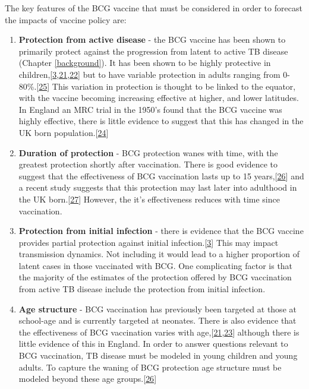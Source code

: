 \documentclass[11pt,twoside]{bristolthesis}
\begin{document}
  The key features of the BCG vaccine that must be considered in order to forecast the impacts of vaccine policy are:
  \begin{enumerate}
  \def\labelenumi{\arabic{enumi}.}
  \item
    \textbf{Protection from active disease} - the BCG vaccine has been shown to primarily protect against the progression from latent to active TB disease (Chapter \ref{background}). It has been shown to be highly protective in children,{[}\protect\hyperlink{ref-Roy2014}{3},\protect\hyperlink{ref-Rodrigues1993}{21},\protect\hyperlink{ref-Colditz1994}{22}{]} but to have variable protection in adults ranging from 0-80\%.{[}\protect\hyperlink{ref-Zwerling2011}{25}{]} This variation in protection is thought to be linked to the equator, with the vaccine becoming increasing effective at higher, and lower latitudes. In England an MRC trial in the 1950's found that the BCG vaccine was highly effective, there is little evidence to suggest that this has changed in the UK born population.{[}\protect\hyperlink{ref-Hart1972}{24}{]}
  \item
    \textbf{Duration of protection} - BCG protection wanes with time, with the greatest protection shortly after vaccination. There is good evidence to suggest that the effectiveness of BCG vaccination lasts up to 15 years,{[}\protect\hyperlink{ref-Abubakar2013}{26}{]} and a recent study suggests that this protection may last later into adulthood in the UK born.{[}\protect\hyperlink{ref-Mangtani2017}{27}{]} However, the it's effectiveness reduces with time since vaccination.
  \item
    \textbf{Protection from initial infection} - there is evidence that the BCG vaccine provides partial protection against initial infection.{[}\protect\hyperlink{ref-Roy2014}{3}{]} This may impact transmission dynamics. Not including it would lead to a higher proportion of latent cases in those vaccinated with BCG. One complicating factor is that the majority of the estimates of the protection offered by BCG vaccination from active TB disease include the protection from initial infection.
  \item
    \textbf{Age structure} - BCG vaccination has previously been targeted at those at school-age and is currently targeted at neonates. There is also evidence that the effectiveness of BCG vaccination varies with age,{[}\protect\hyperlink{ref-Rodrigues1993}{21},\protect\hyperlink{ref-Mangtani2014a}{23}{]} although there is little evidence of this in England. In order to answer questions relevant to BCG vaccination, TB disease must be modeled in young children and young adults. To capture the waning of BCG protection age structure must be modeled beyond these age groups.{[}\protect\hyperlink{ref-Abubakar2013}{26}{]}

\end{enumerate}
\end{document}

